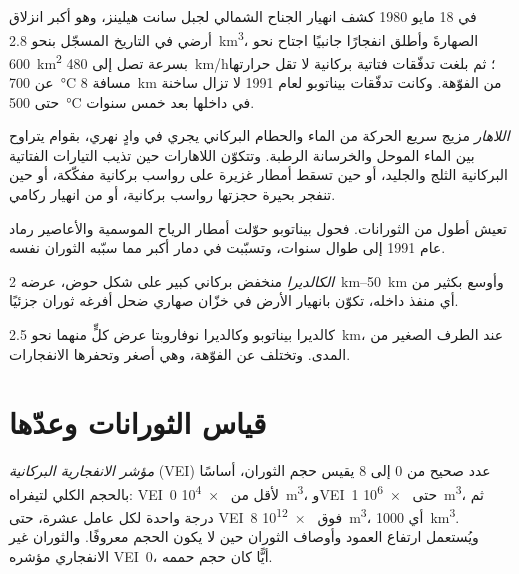 في 18 مايو 1980 كشف انهيار الجناح الشمالي لجبل سانت هيلينز، وهو أكبر
انزلاق أرضي في التاريخ المسجّل بنحو \qty{2.8}{km^3}، الصهارةَ
وأطلق انفجارًا جانبيًا اجتاح نحو \qty{600}{km^2} بسرعة تصل إلى
\qty{480}{km/h}؛ ثم بلغت تدفّقات فتاتية بركانية لا تقل حرارتها عن \qty{700}{\celsius}
مسافة \qty{8}{km} من الفوّهة. وكانت تدفّقات بيناتوبو لعام 1991 لا تزال ساخنة حتى
\qty{500}{\celsius} في داخلها بعد خمس سنوات.

\begin{definition}[اللاهار]\label{def:b2:eruptive-styles:lahar}
\emph{اللاهار} مزيج سريع الحركة من الماء والحطام البركاني
يجري في وادٍ نهري، بقوام يتراوح بين الماء الموحل
والخرسانة الرطبة. وتتكوّن اللاهارات حين تذيب التيارات الفتاتية البركانية الثلج والجليد، أو حين
تسقط أمطار غزيرة على رواسب بركانية مفكّكة، أو حين تنفجر بحيرة حجزتها رواسب
بركانية، أو من انهيار ركامي.
\end{definition}

 تعيش أطول من الثورانات. فحول بيناتوبو حوّلت أمطار الرياح الموسمية والأعاصير
رماد عام 1991 إلى  طوال سنوات، وتسبّبت في دمار أكبر مما سبّبه
الثوران نفسه.

\begin{definition}[الكالديرا]\label{def:b2:eruptive-styles:caldera}
\emph{الكالديرا} منخفض بركاني كبير على شكل حوض،
عرضه \qtyrange{2}{50}{km} وأوسع بكثير من أي منفذ داخله، تكوّن
بانهيار الأرض في خزّان صهاري ضحل أفرغه ثوران
جزئيًا.
\end{definition}

كالديرا بيناتوبو وكالديرا نوفاروبتا عرض كلٍّ منهما نحو \qty{2.5}{km}، عند
الطرف الصغير من المدى. وتختلف  عن الفوّهة، وهي أصغر وتحفرها الانفجارات.

\section{قياس الثورانات وعدّها}

\begin{definition}\label{def:b2:eruptive-styles:vei}
\emph{مؤشر الانفجارية البركانية} (VEI)
عدد صحيح من 0 إلى 8 يقيس حجم الثوران، أساسًا بالحجم
الكلي لتيفراه: VEI~0 لأقل من \qty{e4}{m^3}، وVEI~1 حتى
\qty{e6}{m^3}، ثم درجة واحدة لكل عامل عشرة، حتى VEI~8 فوق
\qty{e12}{m^3}، أي \qty{1000}{km^3}. ويُستعمل ارتفاع العمود وأوصاف الثوران
حين لا يكون الحجم معروفًا. والثوران غير الانفجاري مؤشره VEI~0،
أيًّا كان حجم حممه.
\end{definition}

